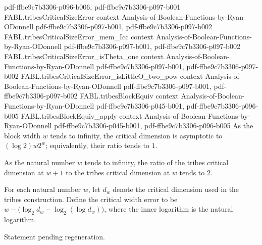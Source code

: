 \begin{theorem}
  {pdf-ffbe9c7b3306-p096-b006,
    pdf-ffbe9c7b3306-p097-b001}
\proofstep
  {FABL.tribesCriticalSizeError}
  {context}
  {Analysis-of-Boolean-Functions-by-Ryan-ODonnell}
  {pdf-ffbe9c7b3306-p097-b001,
    pdf-ffbe9c7b3306-p097-b002}
\proofstep
  {FABL.tribesCriticalSizeError_mem_Icc}
  {context}
  {Analysis-of-Boolean-Functions-by-Ryan-ODonnell}
  {pdf-ffbe9c7b3306-p097-b001,
    pdf-ffbe9c7b3306-p097-b002}
\proofstep
  {FABL.tribesCriticalSizeError_isTheta_one}
  {context}
  {Analysis-of-Boolean-Functions-by-Ryan-ODonnell}
  {pdf-ffbe9c7b3306-p097-b001,
    pdf-ffbe9c7b3306-p097-b002}
\proofstep
  {FABL.tribesCriticalSizeError_isLittleO_two_pow}
  {context}
  {Analysis-of-Boolean-Functions-by-Ryan-ODonnell}
  {pdf-ffbe9c7b3306-p097-b001,
    pdf-ffbe9c7b3306-p097-b002}
\proofstep
  {FABL.tribesBlockEquiv}
  {context}
  {Analysis-of-Boolean-Functions-by-Ryan-ODonnell}
  {pdf-ffbe9c7b3306-p045-b001,
    pdf-ffbe9c7b3306-p096-b005}
\proofstep
  {FABL.tribesBlockEquiv_apply}
  {context}
  {Analysis-of-Boolean-Functions-by-Ryan-ODonnell}
  {pdf-ffbe9c7b3306-p045-b001,
    pdf-ffbe9c7b3306-p096-b005}
As the block width $w$ tends to infinity, the critical dimension is asymptotic to $(\log
2)w2^w$; equivalently, their ratio tends to $1$.
\end{theorem}

\begin{theorem}
\label{FABL.tendsto_tribesCriticalDimension_succ_div}
\leanok
{}
As the natural number $w$ tends to infinity, the ratio of the tribes critical dimension
at $w+1$ to the tribes critical dimension at $w$ tends to $2$.
\end{theorem}

\begin{definition}
\label{FABL.tribesCriticalWidthError}
\leanok
{}
For each natural number $w$, let $d_w$ denote the critical dimension used in the tribes
construction. Define the critical width error to be $w-\bigl(\log_2 d_w-\log_2(\log
d_w)\bigr)$, where the inner logarithm is the natural logarithm.
\end{definition}

\begin{theorem}
\label{FABL.tribesCriticalWidth_eq_log_sub_loglog_add_error}
\leanok
{}
Statement pending regeneration.
\end{theorem}

